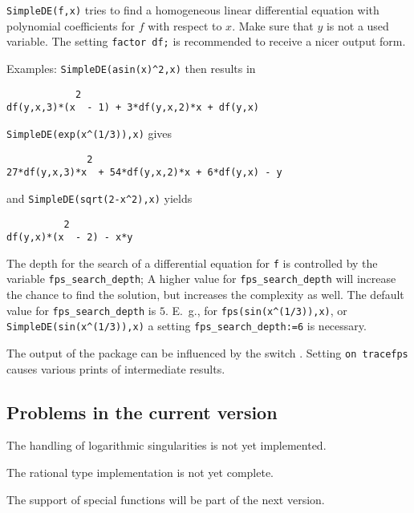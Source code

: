 \texttt{SimpleDE(f,x)} tries to find a homogeneous linear differential
equation with polynomial coefficients for $f$ with respect to $x$.
Make sure that $y$ is not a used variable.
The setting \texttt{factor df;} is recommended to receive a nicer output form.

Examples: \texttt{SimpleDE(asin(x)\textasciicircum2,x)} then results in
\begin{verbatim}
            2
df(y,x,3)*(x  - 1) + 3*df(y,x,2)*x + df(y,x)
\end{verbatim}
\texttt{SimpleDE(exp(x\textasciicircum (1/3)),x)} gives
\begin{verbatim}
              2
27*df(y,x,3)*x  + 54*df(y,x,2)*x + 6*df(y,x) - y
\end{verbatim}
and \texttt{SimpleDE(sqrt(2-x\textasciicircum2),x)} yields
\begin{verbatim}
          2
df(y,x)*(x  - 2) - x*y
\end{verbatim}
\hypertarget{reserved:FPS_SEARCH_DEPTH}{}
The depth for the search of a differential equation for \texttt{f} is
controlled by the variable \texttt{fps\_search\_depth};
A higher value for \texttt{fps\_search\_depth}
will increase the chance to find the solution, but increases the
complexity as well. The default value for \texttt{fps\_search\_depth} 
is $5$. E.~g., for \texttt{fps(sin(x\^{}(1/3)),x)}, or 
\texttt{SimpleDE(sin(x\^{}(1/3)),x)} a setting
\texttt{fps\_search\_depth:=6} is necessary.

\hypertarget{switch:TRACEFPS}{}
The output of the  package can be influenced by the
switch . Setting \texttt{on tracefps} causes various
prints of intermediate results.

\subsection{Problems in the current version}
The handling of logarithmic singularities is not yet implemented.

The rational type implementation is not yet complete.

The support of special functions \cite{Koepf:94c}
will be part of the next version.

